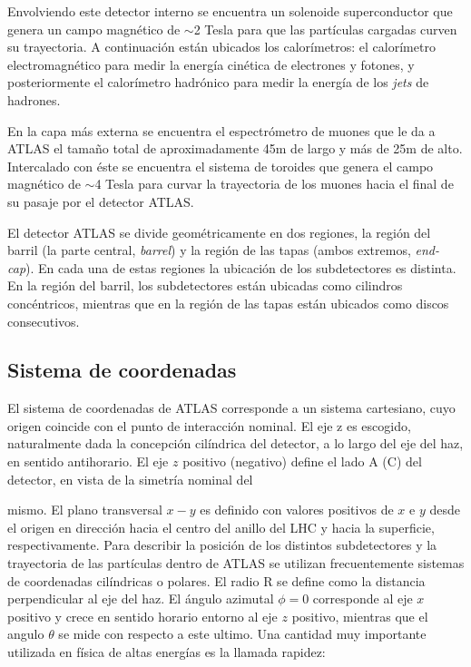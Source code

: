 

Envolviendo este detector interno se encuentra un solenoide superconductor que
genera un campo magnético de $\sim$2 Tesla para que las partículas cargadas
curven su trayectoria. A continuación están ubicados los calorímetros: el
calorímetro electromagnético para medir la energía cinética de electrones y
fotones, y posteriormente el calorímetro hadrónico para medir la energía de los
\emph{jets} de hadrones.

En la capa más externa se encuentra el espectrómetro de muones que le da a ATLAS
el tamaño total de aproximadamente 45m de largo y más de 25m de alto.
Intercalado con éste se encuentra el sistema de toroides que genera el campo
magnético de $\sim$4 Tesla para curvar la trayectoria de los muones hacia el
final de su pasaje por el detector ATLAS.

El detector ATLAS se divide geométricamente en dos regiones, la región del
barril (la parte central, \emph{barrel}) y la región de las tapas (ambos
extremos, \emph{end-cap}). En cada una de estas regiones la ubicación de los
subdetectores es distinta. En la región del barril, los subdetectores están
ubicadas como cilindros concéntricos, mientras que en la región de las tapas
están ubicados como discos consecutivos.

\subsection{Sistema de coordenadas}

El sistema de coordenadas de ATLAS corresponde a un sistema cartesiano, cuyo
origen coincide con el punto de interacción nominal. El eje z es escogido,
naturalmente dada la concepción cilíndrica del detector, a lo largo del eje del
haz, en sentido antihorario. El eje $z$ positivo (negativo) define el lado A (C)
del detector, en vista de la simetría nominal del

mismo. El plano transversal $x-y$ es definido con valores positivos de $x$ e $y$
desde el origen en dirección hacia el centro del anillo del LHC y hacia la
superficie, respectivamente. Para describir la posición de los distintos
subdetectores y la trayectoria de las partículas dentro de ATLAS se utilizan
frecuentemente sistemas de coordenadas cilíndricas o polares. El radio R se
define como la distancia perpendicular al eje del haz. El ángulo azimutal $\phi
= 0$ corresponde al eje $x$ positivo y crece en sentido horario entorno al eje
$z$ positivo, mientras que el angulo $\theta$ se mide con respecto a este
ultimo. Una cantidad muy importante utilizada en física de altas energías es la
llamada rapidez:


